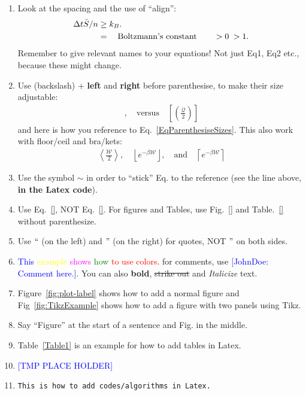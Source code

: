 \documentclass[prl,aps,reprint,noshowpacs,superscriptaddress,floatfix,letterpaper,longbibliography]{revtex4-2}
\newcommand{\PlaceHolder}{\blue{[TMP PLACE HOLDER]}}
\newcommand{\red}{\textcolor{red}}
\newcommand{\green}{\textcolor{green}}
\newcommand{\blue}{\textcolor{blue}}
\newcommand{\yellow}{\textcolor{yellow}}
\newcommand{\magenta}{\textcolor{magenta}}
\newcommand{\Qdot}{\dot{\mathcal{Q}}}
\newcommand{\W}{\mathcal{W}}
\newcommand{\HHquad}{\hspace{0.25em}} %
\begin{document}
\begin{enumerate}
    \item  Look at the spacing and the use of ``align'': 
\begin{align}
\Delta t \bar S/n&\geq k_B.\nonumber\\ 
&=\quad\text{Boltzmann's constant}\qquad >0\HHquad >1 . 
\label{EqSOvern}
\end{align}
Remember to give relevant names to your equations! Not just Eq1, Eq2 etc., because these might change. 
\item Use (backslash) + \textbf{left} and \textbf{right} before parenthesise, to make their size adjustable: 
\begin{align}
[(\frac{\Qdot}{2})],\quad\text{versus}\quad \left[\left(\frac{\Qdot}{2}\right)\right] 
\label{EqParenthesiseSizes}
\end{align}
and here is how you reference to Eq.~\eqref{EqParenthesiseSizes}. 
This also work with floor/ceil and bra/kets: 
\begin{align}
\left\langle \frac{\W}{2}\right\rangle,\quad\left\lfloor e^{-\beta\W}\right\rfloor,\quad\text{and}\quad \left\lceil e^{-\beta\W}\right\rceil 
\label{EqParenthesiseSizes}
\end{align}
\item Use the symbol $\sim$ in order to ``stick'' Eq. to the reference (see the line above, \textbf{in the Latex code}). 
\item Use Eq.~\eqref{}, NOT Eq.~\ref{}. For figures and Tables, use Fig.~\ref{} and Table.~\ref{} without parenthesize. 
\item Use $``$ (on the left) and $"$ (on the right) for quotes, NOT $"$ on both sides. 
\item \blue{This} \yellow{example} \magenta{shows} \green{how} \red{to use colors}. for comments, use \blue{[JohnDoe: Comment here.]}. You can also \textbf{bold}, \sout{strike out} and \textit{Italicize} text. 
\item Figure~\ref{fig:plot-label} shows how to add a normal figure and Fig~\ref{fig:TikzExample} shows how to add a figure with two panels using Tikz.  
\item Say ``Figure'' at the start of a sentence and Fig. in the middle.  
\item Table~\ref{Table1} is an example for how to add tables in Latex.
\item \PlaceHolder  
\item \begin{verbatim}
This is how to add codes/algorithms in Latex.
\end{verbatim} 


\end{enumerate}
\end{document}
